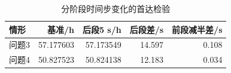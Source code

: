 \begin{table}[!htbp]\centering
\small
\caption{分阶段时间步变化的首达检验}
\begin{tabular}{lrrrr}\toprule
情形 & 基准/h & 后段5 s/h & 后段差/s & 前段减半差/s\\\midrule
问题3 & 57.177603 & 57.173549 & 14.597 & 0.108\\
问题4 & 50.827523 & 50.824138 & 12.183 & 0.034\\
\bottomrule\end{tabular}\end{table}
